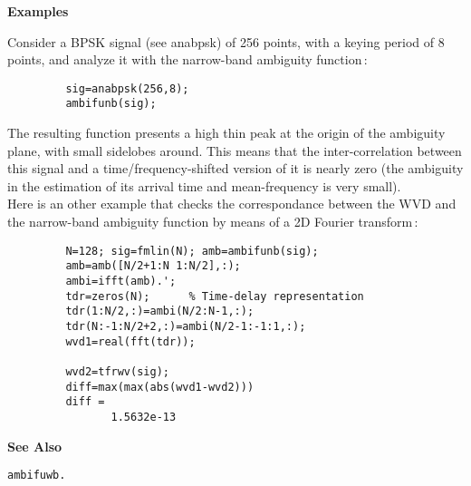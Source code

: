 {\bf \large \sf Examples}\\
\hspace*{1.5cm}
\begin{minipage}[t]{13.5cm}
Consider a BPSK signal (see {\ty anabpsk}) of 256 points, with a keying
period of 8 points, and analyze it with the narrow-band ambiguity
function\,:
\begin{verbatim}
         sig=anabpsk(256,8);
         ambifunb(sig);
\end{verbatim}
The resulting function presents a high thin peak at the origin of the
ambiguity plane, with small sidelobes around. This means that the
inter-correlation between this signal and a time/frequency-shifted version
of it is nearly zero (the ambiguity in the estimation of its arrival time
and mean-frequency is very small).\\

Here is an other example that checks the correspondance between the WVD and
the narrow-band ambiguity function by means of a 2D Fourier transform\,:
\begin{verbatim}
         N=128; sig=fmlin(N); amb=ambifunb(sig);
         amb=amb([N/2+1:N 1:N/2],:);
         ambi=ifft(amb).';
         tdr=zeros(N); 		% Time-delay representation
         tdr(1:N/2,:)=ambi(N/2:N-1,:);
         tdr(N:-1:N/2+2,:)=ambi(N/2-1:-1:1,:);
         wvd1=real(fft(tdr));

         wvd2=tfrwv(sig);
         diff=max(max(abs(wvd1-wvd2)))
         diff = 
                1.5632e-13
\end{verbatim}
\end{minipage}
\vspace*{.5cm}


{\bf \large \sf See Also}\\
\hspace*{1.5cm}
\begin{minipage}[t]{13.5cm}
\begin{verbatim}
ambifuwb.
\end{verbatim}
\end{minipage}

